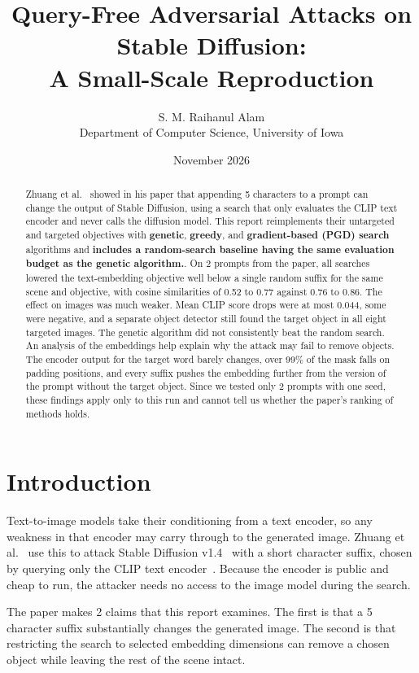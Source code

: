 \documentclass[11pt]{article}
\title{Query-Free Adversarial Attacks on Stable Diffusion:\\ A Small-Scale Reproduction}
\author{S. M. Raihanul Alam\\ Department of Computer Science, University of Iowa}
\date{November 2026}
\begin{document}
\maketitle

\begin{abstract}
Zhuang et al.~\cite{zhuang2023} showed in his paper that appending 5 characters to a prompt can change the output of Stable Diffusion, using a search that only evaluates the CLIP text encoder and never calls the diffusion model. This report reimplements their untargeted and targeted objectives with \textbf{genetic}, \textbf{greedy}, and \textbf{gradient-based (PGD) search} algorithms and \textbf{includes a random-search baseline having the same evaluation budget as the genetic algorithm.}. On 2 prompts from the paper, all searches lowered the text-embedding objective well below a single random suffix for the same scene and objective, with cosine similarities of 0.52 to 0.77 against 0.76 to 0.86. The effect on images was much weaker. Mean CLIP score drops were at most 0.044, some were negative, and a separate object detector still found the target object in all eight targeted images. The genetic algorithm did not consistently beat the random search. An analysis of the embeddings help explain why the attack may fail to remove objects. The encoder output for the target word barely changes, over 99\% of the mask falls on padding positions, and every suffix pushes the embedding further from the version of the prompt without the target object. Since we tested only 2 prompts with one seed, these findings apply only to this run and cannot tell us whether the paper’s ranking of methods holds.
\end{abstract}

\section{Introduction}

Text-to-image models take their conditioning from a text encoder, so any weakness in that encoder may carry through to the generated image. Zhuang et al.~\cite{zhuang2023} use this to attack Stable Diffusion v1.4~\cite{rombach2022} with a short character suffix, chosen by querying only the CLIP text encoder~\cite{radford2021}. Because the encoder is public and cheap to run, the attacker needs no access to the image model during the search.

The paper makes 2 claims that this report examines. The first is that a 5 character suffix substantially changes the generated image. The second is that restricting the search to selected embedding dimensions can remove a chosen object while leaving the rest of the scene intact.
\end{document}

